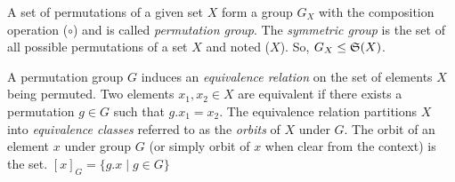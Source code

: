 
A set of permutations of a given set $X$ form a group $G_X$ with the composition operation ($\circ$) and is called \emph{permutation group}.
The \emph{symmetric group} is the set of all possible permutations of a set $X$ and noted \Group($X$).
So, $G_X \leq \mathfrak{S}(X)$. 

A permutation group $G$ induces an \emph{equivalence relation} on the set of elements $X$ being
permuted. Two elements $x_1, x_2 \in X$ are equivalent if there exists a permutation $g \in G$ such that
$g.x_1 = x_2$. The equivalence relation partitions $X$ into \emph{equivalence classes} referred to
as the \emph{orbits} of $X$ under $G$. The orbit of an element $x$ under group $G$ (or simply orbit of $x$ when clear
from the context) is the set. $[x]_G = \{g.x \mid g \in G\}$

